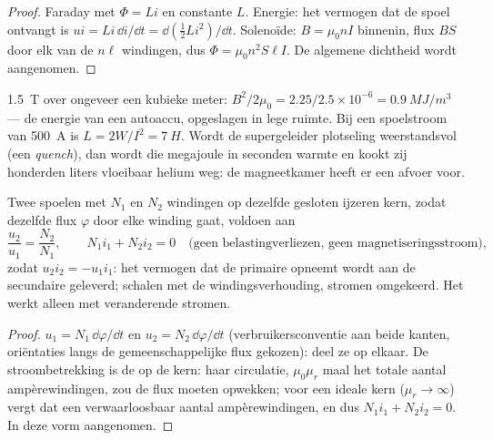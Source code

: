 \begin{proof}
Faraday met $\Phi = Li$ en constante $L$. Energie: het vermogen dat de
spoel ontvangt is $ui = Li\,\dd i/\dd t = \dd(\tfrac12Li^2)/\dd t$. Solenoïde:
$B = \mu_0nI$ binnenin, flux $BS$ door elk van de $n\ell$ windingen, dus $\Phi =
\mu_0n^2S\ell I$. De algemene dichtheid wordt aangenomen.
\end{proof}

\begin{example}\label{ex:b1:induction:mri}
\qty{1.5}{T} over ongeveer een kubieke meter: $B^2/2\mu_0 = 2.25/2.5 \times 10^{-6} =
\qty{0.9}{MJ/m^3}$ --- de energie van een autoaccu, opgeslagen in lege ruimte.
Bij een spoelstroom van \qty{500}{A} is $L = 2W/I^2 = \qty{7}{H}$. Wordt de
supergeleider plotseling weerstandsvol (een \emph{quench}), dan wordt die megajoule
in seconden warmte en kookt zij honderden liters vloeibaar
helium weg: de magneetkamer heeft er een afvoer voor.
\end{example}

\begin{proposition}\label{prop:b1:induction:transformer}
Twee spoelen met $N_1$ en $N_2$ windingen op dezelfde gesloten ijzeren kern,
zodat dezelfde flux $\varphi$ door elke winding gaat, voldoen aan
\[
\frac{u_2}{u_1} = \frac{N_2}{N_1} , \qquad N_1i_1 + N_2i_2 = 0 \quad\text{(geen belastingverliezen, geen magnetiseringsstroom)},
\]
zodat $u_2i_2 = -u_1i_1$: het vermogen dat de primaire opneemt wordt aan de
secundaire geleverd;  schalen met de windingsverhouding, stromen
omgekeerd. Het werkt alleen met veranderende stromen.
\end{proposition}

\begin{proof}
$u_1 = N_1\,\dd\varphi/\dd t$ en $u_2 = N_2\,\dd\varphi/\dd t$ (verbruikersconventie
aan beide kanten, oriëntaties langs de gemeenschappelijke flux gekozen): deel ze op elkaar.
De stroombetrekking is de  op de kern: haar circulatie,
$\mu_0\mu_r$ maal het totale aantal ampèrewindingen, zou de flux moeten
opwekken; voor een ideale kern ($\mu_r \to \infty$) vergt dat een verwaarloosbaar aantal
ampèrewindingen, en dus $N_1i_1 + N_2i_2 = 0$. In deze vorm aangenomen.
\end{proof}

